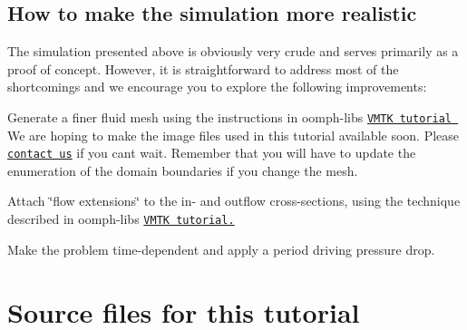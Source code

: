 \hypertarget{index_realism}{}\subsection{How to make the simulation more realistic}\label{index_realism}
The simulation presented above is obviously very crude and serves primarily as a proof of concept. However, it is straightforward to address most of the shortcomings and we encourage you to explore the following improvements\+:
\begin{DoxyItemize}
\item Generate a finer fluid mesh using the instructions in {\ttfamily oomph-\/lib\textquotesingle{}s} \href{../../../meshes/mesh_from_vmtk/html/index.html}{\tt V\+M\+TK tutorial } We are hoping to make the image files used in this tutorial available soon. Please \href{../../../contact/html/index.html}{\tt contact us} if you can\textquotesingle{}t wait. Remember that you will have to update the enumeration of the domain boundaries if you change the mesh. ~\newline
~\newline

\item Attach \char`\"{}flow extensions\char`\"{} to the in-\/ and outflow cross-\/sections, using the technique described in {\ttfamily oomph-\/lib\textquotesingle{}s} \href{../../../meshes/mesh_from_vmtk/html/index.html#add_extensions}{\tt V\+M\+TK tutorial.} ~\newline
~\newline

\item Make the problem time-\/dependent and apply a period driving pressure drop. ~\newline
~\newline

\end{DoxyItemize}

 

\hypertarget{index_sources}{}\section{Source files for this tutorial}\label{index_sources}

